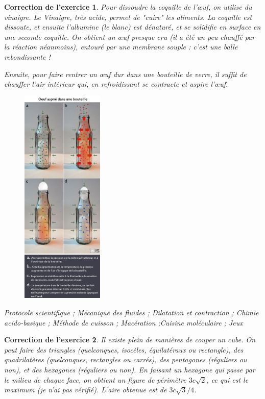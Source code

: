 \documentclass[12pt]{article}
\theoremstyle{break}
\newtheorem{cor}{Correction de l'exercice}
\begin{document}
\begin{cor}
Pour dissoudre la coquille de l’œuf, on utilise du vinaigre. Le Vinaigre, très acide, permet de "cuire" les aliments. La coquille est dissoute, et ensuite l'albumine (le blanc) est dénaturé, et se solidifie en surface en une seconde coquille. On obtient un œuf presque cru (il a été un peu chauffé par la réaction néanmoins), entouré par une membrane souple : c'est une balle rebondissante !

Ensuite, pour faire rentrer un œuf dur dans une bouteille de verre, il suffit de chauffer l'air intérieur qui, en refroidissant se contracte et aspire l’œuf.

\begin{figure}[!ht]
	\centering
    \includegraphics[width=0.35\textwidth]{ExplicationOeuf.jpg}
    
\end{figure}

\textit{Protocole scientifique ; Mécanique des fluides ; Dilatation et contraction ; Chimie acido-basique ; Méthode de cuisson ; Macération ;Cuisine moléculaire ; Jeux}
\end{cor}


\begin{cor}
Il existe plein de manières de couper un cube. On peut faire des triangles (quelconques, isocèles, équilatéraux ou rectangle), des quadrilatères (quelconques, rectangles ou carrés), des pentagones (réguliers ou non), et des hexagones (réguliers ou non). En faisant un hexagone qui passe par le milieu de chaque face, on obtient un figure de périmètre $3c \sqrt{2}$, ce qui est le maximum (je n'ai pas vérifié). L'aire obtenue est de $3c \sqrt{3}/4$.
\end{cor}
\end{document}
